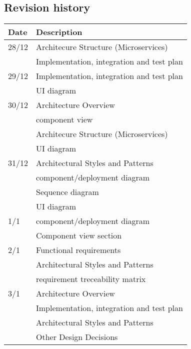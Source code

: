 \subsection{Revision history}
\label{sec:history}

\begin{center}
    \setlength\arrayrulewidth{1pt}
    \begin{longtable}{ll}
        
        \hline
        \rowcolor{myblue}\color{white}Date & \color{white}Description \\
        \hline
        28/12 & Architecure Structure (Microservices) \\
                & Implementation, integration and test plan \\
        \hline
        29/12 & Implementation, integration and test plan \\
                & UI diagram \\
        \hline
        30/12 & Architecture Overview \\
                & component view \\
                & Architecure Structure (Microservices) \\
                & UI diagram \\
        \hline
        31/12 & Architectural Styles and Patterns \\
                & component/deployment diagram \\
                & Sequence diagram \\
                & UI diagram \\
        \hline
        1/1 & component/deployment diagram \\
         & Component view section \\
        \hline
        2/1 & Functional requirements \\
         & Architectural Styles and Patterns \\
         & requirement treceability matrix \\
        \hline
        3/1 & Architecture Overview \\
         & Implementation, integration and test plan \\
         & Architectural Styles and Patterns \\
         & Other Design Decisions \\

\end{longtable}
\end{center}
